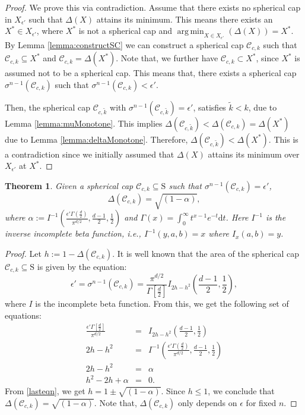 \documentclass[letterpaper, 10 pt, conference]{ieeeconf}  %
\newcommand{\calC}{\mathcal{C}}
\newcommand{\sphere}{\text{S}}
\DeclareMathOperator*{\argmin}{arg\,min}
\newtheorem{theorem}{Theorem}[section]
\begin{document}
\begin{proof}We prove this via contradiction. Assume that there exists no spherical cap in $X_{\epsilon'}$ such that $\Delta(X)$ attains its minimum. This means there exists an $X^* \in X_{\epsilon'}$, where $X^*$ is not a spherical cap and $\argmin_{X \in X_{\epsilon'}}(\Delta(X))=X^*$. By Lemma \ref{lemma:constructSC} we can construct a spherical cap $\calC_{c,k}$ such that $\calC_{c,k} \subseteq X^*$ and $\calC_{c,k} = \Delta(X^*)$. Note that, we further have $\calC_{c,k} \subset X^*$, since $X^*$ is assumed not to be a spherical cap. This means that, there exists a spherical cap $\sigma^{n-1}(\calC_{c,k})$ such that $\sigma^{n-1}(\calC_{c,k}) < \epsilon'$. 

Then, the spherical cap $\calC_{c, \tilde{k}}$ with $\sigma^{n-1}(\calC_{c, \tilde{k}}) = \epsilon'$, satisfies $\tilde{k} < k$, due to Lemma \ref{lemma:muMonotone}. This implies $\Delta(\calC_{c, \tilde{k}}) < \Delta(\calC_{c, k}) = \Delta(X^*)$ due to Lemma \ref{lemma:deltaMonotone}. Therefore, $\Delta(\calC_{c, \tilde{k}}) < \Delta(X^*)$. This is a contradiction since we initially assumed that $\Delta(X)$ attains its minimum over $X_{\epsilon'}$ at $X^*$.
\end{proof}

\begin{theorem}Given a spherical cap $\calC_{c,k} \subseteq \sphere$ such that $\sigma^{n-1}(\calC_{c,k}) = \epsilon'$, 
\begin{equation*}\Delta(\calC_{c,k}) = \sqrt{(1-\alpha)}, \end{equation*}
where $\alpha := I^{-1}\left(\frac{\epsilon'\Gamma(\frac{d}{2})}{\pi^{d/2}}, \frac{d-1}{2}, \frac{1}{2}\right)$ and $\Gamma(x)=\int_{0}^{\infty} t^{x-1} e^{-t} \text{d}t$. Here $I^{-1}$ is the inverse incomplete beta function, i.e.,  $I^{-1}(y, a,b)= x$ where $I_x(a,b)=y$.
\end{theorem}

\begin{proof}Let $h:=1-\Delta(\calC_{c,k})$. It is well known \cite{sphericalCapRef} that the area of the spherical cap $\calC_{c,k} \subseteq \sphere$ is given by the equation:
\begin{equation}\epsilon' = \sigma^{n-1}(\calC_{c,k}) = \frac{\pi^{d/2}}{\Gamma[\frac{d}{2}]}I_{2h-h^2} \left(\frac{d-1}{2}, \frac{1}{2}\right),
\end{equation}
where $I$ is the incomplete beta function. 
From this, we get the following set of equations:
\begin{eqnarray}\nonumber \frac{\epsilon' \Gamma[\frac{d}{2}]}{\pi^{d/2}} &=& I_{2h-h^2}\left(\frac{d-1}{2}, \frac{1}{2}\right) \\
\nonumber 2h-h^2 &=&  I^{-1}\left(\frac{\epsilon'\Gamma(\frac{d}{2})}{\pi^{d/2}}, \frac{d-1}{2}, \frac{1}{2}\right) \\
\nonumber 2h-h^2 & = & \alpha \\
\label{lasteqn}h^2 -2h +\alpha &=& 0.
\end{eqnarray}
From \eqref{lasteqn}, we get $h=1\pm \sqrt{(1-\alpha)}$. Since $h\leq1$, we conclude that \mbox{$\Delta(\calC_{c,k}) = \sqrt{(1-\alpha)}$.} Note that, $\Delta(\calC_{c,k})$ only depends on $\epsilon$ for fixed $n$.
\end{proof}
\end{document}

